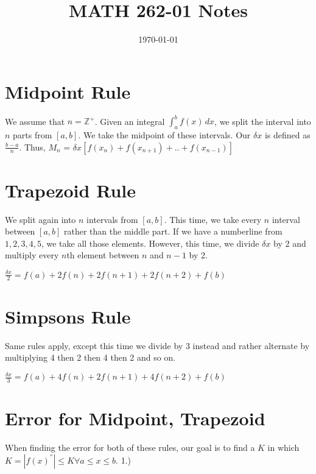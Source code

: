 \documentclass[a4paper]{article}
\title{MATH 262-01 Notes}
\date{\today}
\begin{document}
\maketitle
\section{Midpoint Rule}
We assume that $n = \mathbb{Z}^+$. Given an integral \(\int_{a}^{b}f(x)\,dx\), we split the interval into $n$ parts from $[a, b]$. We take the midpoint of these intervals. Our $\delta x$ is defined as $\frac{b-a}{n}$. Thus, $M_{n}$ = $\delta x[f(x_{n})+f(x_{n+1})+..+f(x_{n-1})]$

\section{Trapezoid Rule}
We split again into $n$ intervals from $[a,b]$. This time, we take every $n$ interval between $[a,b]$ rather than the middle part. If we have a numberline from $1, 2, 3, 4, 5$, we take all those elements. 
\newline
However, this time, we divide $\delta x$ by 2 and multiply every $n$th element between $n$ and $n-1$ by 2.
\begin{center}
  $\frac{\delta x}{2} = f(a) + 2f(n) + 2f(n+1) + 2f(n+2) + f(b)$
\end{center}

\section{Simpsons Rule}
Same rules apply, except this time we divide by 3 instead and rather alternate by multiplying 4 then 2 then 4 then 2 and so on.

\begin{center}
 $\frac{\delta x}{3} = f(a) + 4f(n) + 2f(n+1) + 4f(n+2) + f(b)$
\end{center}

\section{Error for Midpoint, Trapezoid}
When finding the error for both of these rules, our goal is to find a $K$ in which $K = |f(x)^{''}|\le K  \forall a \le x \le b$. 1.) 
\end{document}
